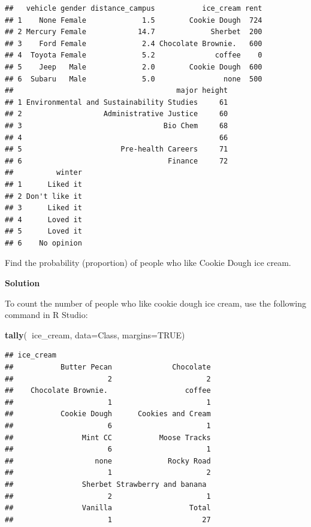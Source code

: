 \documentclass[
]{book}
\newenvironment{Shaded}{\begin{snugshade}}{\end{snugshade}}
\newcommand{\DataTypeTok}[1]{\textcolor[rgb]{0.13,0.29,0.53}{#1}}
\newcommand{\KeywordTok}[1]{\textcolor[rgb]{0.13,0.29,0.53}{\textbf{#1}}}
\newcommand{\NormalTok}[1]{#1}
\newcommand{\OperatorTok}[1]{\textcolor[rgb]{0.81,0.36,0.00}{\textbf{#1}}}
\newcommand{\OtherTok}[1]{\textcolor[rgb]{0.56,0.35,0.01}{#1}}
\begin{document}
\begin{verbatim}
##   vehicle gender distance_campus           ice_cream rent
## 1    None Female             1.5        Cookie Dough  724
## 2 Mercury Female            14.7             Sherbet  200
## 3    Ford Female             2.4 Chocolate Brownie.   600
## 4  Toyota Female             5.2              coffee    0
## 5    Jeep   Male             2.0        Cookie Dough  600
## 6  Subaru   Male             5.0                none  500
##                                      major height
## 1 Environmental and Sustainability Studies     61
## 2                   Administrative Justice     60
## 3                                 Bio Chem     68
## 4                                              66
## 5                       Pre-health Careers     71
## 6                                  Finance     72
##          winter
## 1      Liked it
## 2 Don't like it
## 3      Liked it
## 4      Loved it
## 5      Loved it
## 6    No opinion
\end{verbatim}

Find the probability (proportion) of people who like Cookie Dough ice cream.

\textbf{Solution}

To count the number of people who like cookie dough ice cream, use the following command in R Studio:

\begin{Shaded}
\begin{Highlighting}[]
\KeywordTok{tally}\NormalTok{(}\OperatorTok{~}\NormalTok{ice_cream, }\DataTypeTok{data=}\NormalTok{Class, }\DataTypeTok{margins=}\OtherTok{TRUE}\NormalTok{)}
\end{Highlighting}
\end{Shaded}

\begin{verbatim}
## ice_cream
##           Butter Pecan              Chocolate 
##                      2                      2 
##    Chocolate Brownie.                  coffee 
##                      1                      1 
##           Cookie Dough      Cookies and Cream 
##                      6                      1 
##                Mint CC           Moose Tracks 
##                      6                      1 
##                   none             Rocky Road 
##                      1                      2 
##                Sherbet Strawberry and banana  
##                      2                      1 
##                Vanilla                  Total 
##                      1                     27
\end{verbatim}
\end{document}
